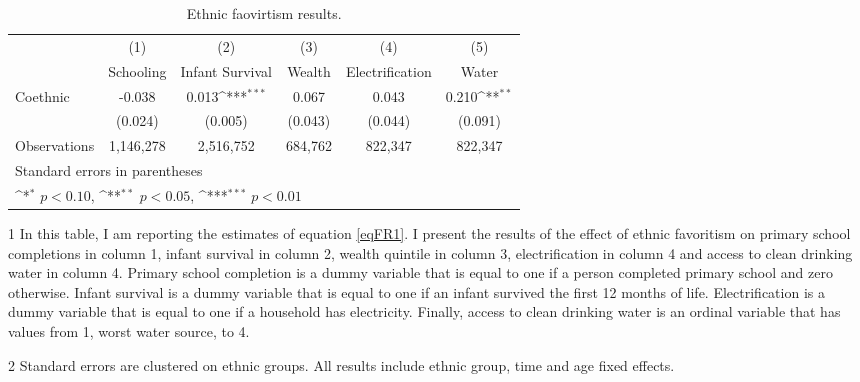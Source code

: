\begin{table}[htbp]\centering
\def\sym#1{\ifmmode^{#1}\else\(^{#1}\)\fi}
\caption{Ethnic faovirtism results.}
\begin{adjustbox}{max width=\textwidth}
\begin{threeparttable}[t]
  \centering
\begin{tabular}{l*{5}{c}}
\hline
                    &\multicolumn{1}{c}{(1)}&\multicolumn{1}{c}{(2)}&\multicolumn{1}{c}{(3)}&\multicolumn{1}{c}{(4)}&\multicolumn{1}{c}{(5)}\\
                    &\multicolumn{1}{c}{Schooling}&\multicolumn{1}{c}{Infant Survival}&\multicolumn{1}{c}{Wealth}&\multicolumn{1}{c}{Electrification}&\multicolumn{1}{c}{Water}\\
\midrule
Coethnic            &      -0.038         &       0.013\sym{***}&       0.067         &       0.043         &       0.210\sym{**} \\
                    &     (0.024)         &     (0.005)         &     (0.043)         &     (0.044)         &     (0.091)         \\
\midrule
Observations        & 1,146,278         & 2,516,752         &  684,762         &  822,347         &  822,347         \\
\hline
\multicolumn{6}{l}{\footnotesize Standard errors in parentheses}\\
\multicolumn{6}{l}{\footnotesize \sym{*} \(p<0.10\), \sym{**} \(p<0.05\), \sym{***} \(p<0.01\)}\\
\end{tabular}
\begin{footnotesize}
 \begin{tablenotes}
     \item[1] In this table, I am reporting the estimates of equation \ref{eqFR1}. I present the results of the effect of ethnic favoritism on primary school completions in column 1, infant survival in column 2, wealth quintile in column 3, electrification in column 4 and access to clean drinking water in column 4. Primary school completion is a dummy variable that is equal to one if a person completed primary school and zero otherwise. Infant survival is a dummy variable that is equal to one if an infant survived the first 12 months of life. Electrification is a dummy variable that is equal to one if a household has electricity. Finally, access to clean drinking water is an ordinal variable that has values from 1, worst water source, to 4.
     \item[2] Standard errors are clustered on ethnic groups. All results include ethnic group, time and age fixed effects.
   \end{tablenotes}
   \end{footnotesize}
    \end{threeparttable}%
\label{tab:eth}
\end{adjustbox}
\end{table}
